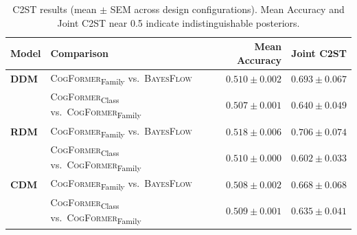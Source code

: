 \begin{table}[ht]
\centering
\small
\caption{C2ST results (mean $\pm$ SEM across design configurations). Mean Accuracy and Joint C2ST near 0.5 indicate indistinguishable posteriors.}
\label{tab:c2st}
\begin{tabular}{llrr}
\toprule
\textbf{Model} & \textbf{Comparison} & Mean Accuracy & Joint C2ST \\
\midrule
\textbf{DDM} & \textsc{CogFormer}\textsubscript{Family} vs.\ \textsc{BayesFlow} & $0.510 \pm 0.002$ & $0.693 \pm 0.067$ \\
 & \textsc{CogFormer}\textsubscript{Class} vs.\ \textsc{CogFormer}\textsubscript{Family} & $0.507 \pm 0.001$ & $0.640 \pm 0.049$ \\
\midrule
\textbf{RDM} & \textsc{CogFormer}\textsubscript{Family} vs.\ \textsc{BayesFlow} & $0.518 \pm 0.006$ & $0.706 \pm 0.074$ \\
 & \textsc{CogFormer}\textsubscript{Class} vs.\ \textsc{CogFormer}\textsubscript{Family} & $0.510 \pm 0.000$ & $0.602 \pm 0.033$ \\
\midrule
\textbf{CDM} & \textsc{CogFormer}\textsubscript{Family} vs.\ \textsc{BayesFlow} & $0.508 \pm 0.002$ & $0.668 \pm 0.068$ \\
 & \textsc{CogFormer}\textsubscript{Class} vs.\ \textsc{CogFormer}\textsubscript{Family} & $0.509 \pm 0.001$ & $0.635 \pm 0.041$ \\
\bottomrule
\end{tabular}
\end{table}